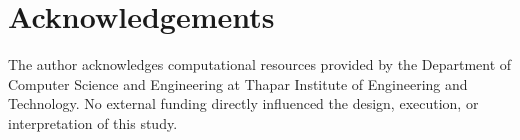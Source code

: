 \documentclass[final,3p,times]{elsarticle}
\begin{document}
\section*{Acknowledgements}
The author acknowledges computational resources provided by the Department of Computer Science and Engineering at Thapar Institute of Engineering and Technology. No external funding directly influenced the design, execution, or interpretation of this study.



\end{document}
